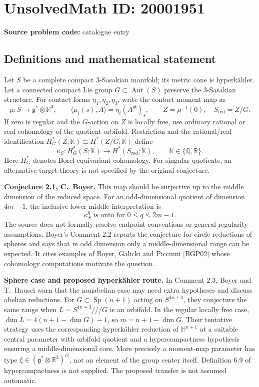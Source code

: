 \documentclass[11pt]{article}
\newcommand{\Q}{\mathbb{Q}}
\newcommand{\R}{\mathbb{R}}
\begin{document}
\section*{UnsolvedMath ID: 20001951}
\textbf{Source problem code:} catalogue entry
\subsection{Definitions and mathematical statement}
Let $S$ be a complete compact 3-Sasakian manifold; its metric cone is hyperk\"ahler. Let a connected compact Lie group $G\subset\operatorname{Aut}(S)$ preserve the 3-Sasakian structure. For contact forms $\eta_1,\eta_2,\eta_3$, write the contact moment map as
\[
 \mu:S\longrightarrow\mathfrak g^*\otimes\R^3,
 \qquad \langle\mu_i(s),A\rangle=\eta_i(A^\#)_s,
 \qquad Z=\mu^{-1}(0),\quad S_{\mathrm{red}}=Z/G.
\]
If zero is regular and the $G$-action on $Z$ is locally free, use ordinary rational or real cohomology of the quotient orbifold. Restriction and the rational/real identification $H_G^*(Z;\mathbb K)\cong H^*(Z/G;\mathbb K)$ define
\[
 \kappa_S:H_G^*(S;\mathbb K)\longrightarrow
                  H^*(S_{\mathrm{red}};\mathbb K),
 \qquad \mathbb K\in\{\Q,\R\}.
\]
Here $H_G^*$ denotes Borel equivariant cohomology. For singular quotients, an alternative target theory is not specified by the original conjecture.

\textbf{Conjecture 2.1, C.~Boyer.} This map should be surjective up to the middle dimension of the reduced space. For an odd-dimensional quotient of dimension $4m-1$, the inclusive lower-middle interpretation is
\[
 \kappa_S^q\text{ is onto for }0\le q\le2m-1.
\]
The source does not formally resolve endpoint conventions or general regularity assumptions. Boyer's Comment 2.2 reports the conjecture for circle reductions of spheres and says that in odd dimension only a middle-dimensional range can be expected. It cites examples of Boyer, Galicki and Piccinni [BGP02] whose cohomology computations motivate the question.

\textbf{Sphere case and proposed hyperk\"ahler route.} In Comment 2.3, Boyer and T.~Hausel warn that the nonabelian case may need extra hypotheses and discuss abelian reductions. For $G\subset\operatorname{Sp}(n+1)$ acting on $S^{4n+3}$, they conjecture the same range when $L=S^{4n+3}\mathbin{///}G$ is an orbifold. In the regular locally free case, $\dim L=4(n+1-\dim G)-1$, so $m=n+1-\dim G$. Their tentative strategy uses the corresponding hyperk\"ahler reduction of $\mathbb H^{n+1}$ at a suitable central parameter with orbifold quotient and a hypercompactness hypothesis ensuring a middle-dimensional core. More precisely a moment-map parameter has type $\xi\in(\mathfrak g^*\otimes\R^3)^G$, not an element of the group center itself. Definition 6.9 of hypercompactness is not supplied. The proposed transfer is not assumed automatic.
\end{document}
